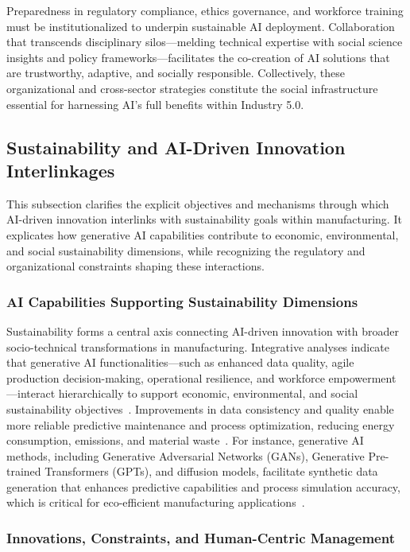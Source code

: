 \documentclass[sigconf]{acmart}
\begin{document}
Preparedness in regulatory compliance, ethics governance, and workforce training must be institutionalized to underpin sustainable AI deployment. Collaboration that transcends disciplinary silos—melding technical expertise with social science insights and policy frameworks—facilitates the co-creation of AI solutions that are trustworthy, adaptive, and socially responsible. Collectively, these organizational and cross-sector strategies constitute the social infrastructure essential for harnessing AI’s full benefits within Industry 5.0.

\subsection{Sustainability and AI-Driven Innovation Interlinkages}

This subsection clarifies the explicit objectives and mechanisms through which AI-driven innovation interlinks with sustainability goals within manufacturing. It explicates how generative AI capabilities contribute to economic, environmental, and social sustainability dimensions, while recognizing the regulatory and organizational constraints shaping these interactions.

\subsubsection{AI Capabilities Supporting Sustainability Dimensions}

Sustainability forms a central axis connecting AI-driven innovation with broader socio-technical transformations in manufacturing. Integrative analyses indicate that generative AI functionalities—such as enhanced data quality, agile production decision-making, operational resilience, and workforce empowerment—interact hierarchically to support economic, environmental, and social sustainability objectives~\cite{ref5}. Improvements in data consistency and quality enable more reliable predictive maintenance and process optimization, reducing energy consumption, emissions, and material waste~\cite{ref11,ref36}. For instance, generative AI methods, including Generative Adversarial Networks (GANs), Generative Pre-trained Transformers (GPTs), and diffusion models, facilitate synthetic data generation that enhances predictive capabilities and process simulation accuracy, which is critical for eco-efficient manufacturing applications~\cite{ref11}.

\subsubsection{Innovations, Constraints, and Human-Centric Management}
\end{document}
